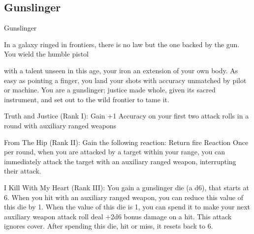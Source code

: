 \subsection{Gunslinger}

                                                  Gunslinger

In a galaxy ringed in frontiers, there is no law but the one backed by the gun. You wield the humble pistol

with a talent unseen in this age, your iron an extension of your own body. As easy as pointing a finger, you
land your shots with accuracy unmatched by pilot or machine. You are a gunslinger; justice made whole,
given its sacred instrument, and set out to the wild frontier to tame it.

Truth and Justice (Rank I): Gain +1 Accuracy on your first two attack rolls in a round with
auxiliary ranged weapons

From The Hip (Rank II): Gain the following reaction:
         Return fire
         Reaction
         Once per round, when you are attacked by a target within your range, you can
         immediately attack the target with an auxiliary ranged weapon, interrupting their attack.

I Kill With My Heart (Rank III): You gain a gunslinger die (a d6), that starts at 6. When you hit
with an auxiliary ranged weapon, you can reduce this value of this die by 1. When the value of
this die is 1, you can spend it to make your next auxiliary weapon attack roll deal +2d6 bonus
damage on a hit. This attack ignores cover. After spending this die, hit or miss, it resets back to
6.